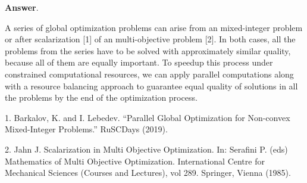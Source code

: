 \documentclass{article}%
\begin{document}
\textbf{Answer}.

A series of global optimization problems can arise from an mixed-integer problem or
after scalarization [1] of an multi-objective problem [2]. In both cases, all the problems from the series have to be solved with approximately similar quality, because all of
them are equally important. To speedup this process under constrained computational resources,
we can apply parallel computations along with a resource balancing approach to guarantee equal
quality of solutions in all the problems by the end of the optimization process.

1. Barkalov, K. and I. Lebedev. “Parallel Global Optimization for Non-convex Mixed-Integer Problems.” RuSCDays (2019).

2. Jahn J. Scalarization in Multi Objective Optimization. In: Serafini P. (eds) Mathematics of Multi Objective Optimization. International Centre for Mechanical Sciences (Courses and Lectures), vol 289. Springer, Vienna (1985).
\end{document}
